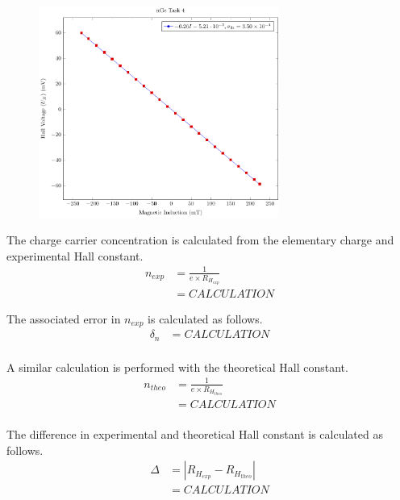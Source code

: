 \documentclass[a4paper]{article}
\begin{document}
\begin{figure}[H]
\centering
\includegraphics[width=0.7\textwidth]{NGePlots/Task4/nGeTask4.pdf}
\label{task34plot}
\end{figure}




\qq The charge carrier concentration is calculated from the elementary
charge and experimental Hall constant.
\begin{align*}
n_{exp} &= \frac{1}{e \times R_{H_{exp}}} \\
	&= CALCULATION 
\end{align*}

The associated error in $n_{exp}$ is calculated as follows.
\begin{align*}
\delta_n &= CALCULATION \\
\end{align*}

A similar calculation is performed with the theoretical Hall constant.
\begin{align*}
n_{theo} &= \frac{1}{e \times R_{H_{theo}}} \\
	&= CALCULATION \\
\end{align*}

The difference in experimental and theoretical Hall constant is calculated as follows.
\begin{align*}
\Delta &= | R_{H_{exp}} - R_{H_{theo}} | \\
	   &= CALCULATION \\
\end{align*}
\end{document}
